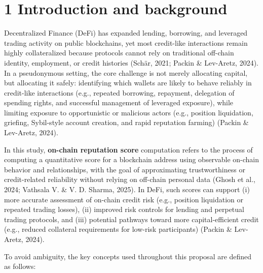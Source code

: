 \clearpage
{}
\section*{1 \textbf{Introduction and background}}
\label{sec:introduction-and-background}

Decentralized Finance (DeFi) has expanded lending, borrowing, and leveraged trading activity on public blockchains, yet most credit-like interactions remain highly collateralized because protocols cannot rely on traditional off-chain identity, employment, or credit histories (Sch\"{a}r, 2021; Packin \& Lev-Aretz, 2024). In a pseudonymous setting, the core challenge is not merely allocating capital, but allocating it safely: identifying which wallets are likely to behave reliably in credit-like interactions (e.g., repeated borrowing, repayment, delegation of spending rights, and successful management of leveraged exposure), while limiting exposure to opportunistic or malicious actors (e.g., position liquidation, griefing, Sybil-style account creation, and rapid reputation farming) (Packin \& Lev-Aretz, 2024).


In this study, \textbf{on-chain reputation score} computation refers to the process of computing a quantitative score for a blockchain address using observable on-chain behavior and relationships, with the goal of approximating trustworthiness or credit-related reliability without relying on off-chain personal data (Ghosh et al., 2024; Vathsala V. \& V. D. Sharma, 2025). In DeFi, such scores can support (i) more accurate assessment of on-chain credit risk (e.g., position liquidation or repeated trading losses), (ii) improved risk controls for lending and perpetual trading protocols, and (iii) potential pathways toward more capital-efficient credit (e.g., reduced collateral requirements for low-risk participants) (Packin \& Lev-Aretz, 2024).


To avoid ambiguity, the key concepts used throughout this proposal are defined as follows:


